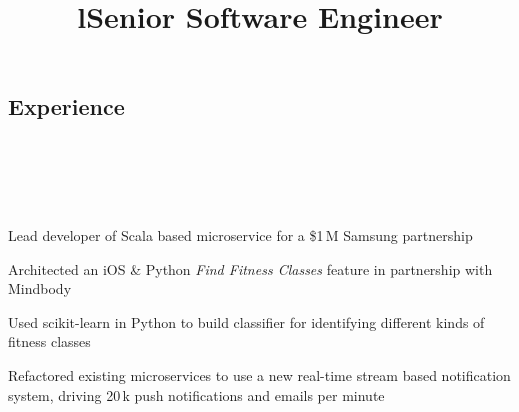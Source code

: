 \documentclass[12pt, tweaklist, line]{res}
\let\tempone\itemize
\let\temptwo\enditemize
\renewenvironment{itemize}{\tempone\vspace{-.15in}\setlength{\topsep}{0pt}\setlength{\itemsep}{3pt}\vspace{-.15in}}{\temptwo}
\begin{document}

\begin{resume}

\section{Experience}
\begin{format}
  \\
  \title{l}\\
  \body\\
\end{format}

\title{Senior Software Engineer}
\begin{position}
\begin{itemize}
\item Lead developer of Scala based microservice for a \$1\,M Samsung partnership
\item Architected an iOS \& Python \textit{Find Fitness Classes} feature in partnership with Mindbody
\item Used scikit-learn in Python to build classifier for identifying different kinds of fitness classes
\item Refactored existing microservices to use a new real-time stream based notification system, driving 20\,k push notifications and emails per minute
\end{itemize}
\end{position}


\end{resume}
\end{document}
